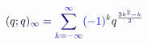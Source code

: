 \documentclass[12pt]{article}
\begin{document}
\makeatletter
\renewcommand*{\@textcolor}[3]{%
  \protect\leavevmode
  \begingroup
    \color#1{#2}#3%
  \endgroup
}
\makeatother
\begin{displaymath}
\mathcolor[RGB]{0,0,15}{(} \mathcolor[RGB]{0,0,30}{q} \mathcolor[RGB]{0,0,45}{;} \mathcolor[RGB]{0,0,60}{q} \mathcolor[RGB]{0,0,75}{)} _ { \mathcolor[RGB]{0,0,90}{\infty} } \mathcolor[RGB]{0,0,105}{=} \mathcolor[RGB]{0,0,120}{\sum} _ { \mathcolor[RGB]{0,0,135}{k} \mathcolor[RGB]{0,0,150}{=} \mathcolor[RGB]{0,0,165}{-} \mathcolor[RGB]{0,0,180}{\infty} } ^ { \mathcolor[RGB]{0,0,195}{\infty} } \mathcolor[RGB]{0,0,210}{(} \mathcolor[RGB]{0,0,225}{-} \mathcolor[RGB]{0,0,240}{1} \mathcolor[RGB]{0,0,255}{)} ^ { \mathcolor[RGB]{0,15,0}{k} } \mathcolor[RGB]{0,15,15}{q} ^ { \mathcolor[RGB]{0,15,30}{\frac { \mathcolor[RGB]{0,15,45}{3} \mathcolor[RGB]{0,15,60}{k} ^ { \mathcolor[RGB]{0,15,75}{2} } \mathcolor[RGB]{0,15,90}{-} \mathcolor[RGB]{0,15,105}{k} } { \mathcolor[RGB]{0,15,120}{2} } } }
\end{displaymath}
\end{document}
